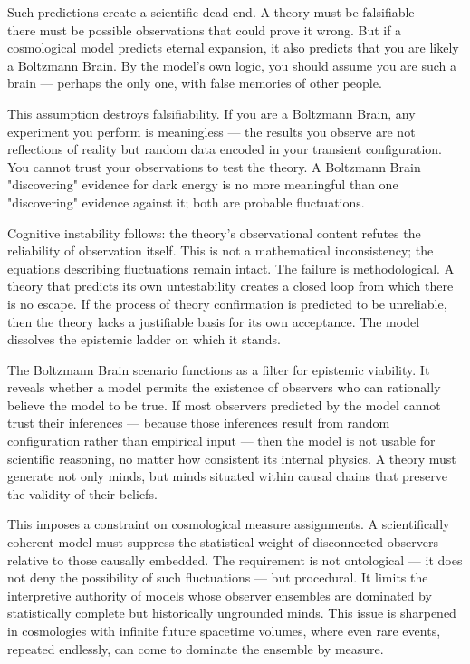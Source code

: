 Such predictions create a scientific dead end. A theory must be falsifiable — there must be possible observations that could prove it wrong. But if a cosmological model predicts eternal expansion, it also predicts that you are likely a Boltzmann Brain. By the model's own logic, you should assume you are such a brain — perhaps the only one, with false memories of other people.

This assumption destroys falsifiability. If you are a Boltzmann Brain, any experiment you perform is meaningless — the results you observe are not reflections of reality but random data encoded in your transient configuration. You cannot trust your observations to test the theory. A Boltzmann Brain "discovering" evidence for dark energy is no more meaningful than one "discovering" evidence against it; both are probable fluctuations.

Cognitive instability follows: the theory's observational content refutes the reliability of observation itself. This is not a mathematical inconsistency; the equations describing fluctuations remain intact. The failure is methodological. A theory that predicts its own untestability creates a closed loop from which there is no escape. If the process of theory confirmation is predicted to be unreliable, then the theory lacks a justifiable basis for its own acceptance. The model dissolves the epistemic ladder on which it stands.

The Boltzmann Brain scenario functions as a filter for epistemic viability. It reveals whether a model permits the existence of observers who can rationally believe the model to be true. If most observers predicted by the model cannot trust their inferences — because those inferences result from random configuration rather than empirical input — then the model is not usable for scientific reasoning, no matter how consistent its internal physics. A theory must generate not only minds, but minds situated within causal chains that preserve the validity of their beliefs.

This imposes a constraint on cosmological measure assignments. A scientifically coherent model must suppress the statistical weight of disconnected observers relative to those causally embedded. The requirement is not ontological — it does not deny the possibility of such fluctuations — but procedural. It limits the interpretive authority of models whose observer ensembles are dominated by statistically complete but historically ungrounded minds. This issue is sharpened in cosmologies with infinite future spacetime volumes, where even rare events, repeated endlessly, can come to dominate the ensemble by measure.

